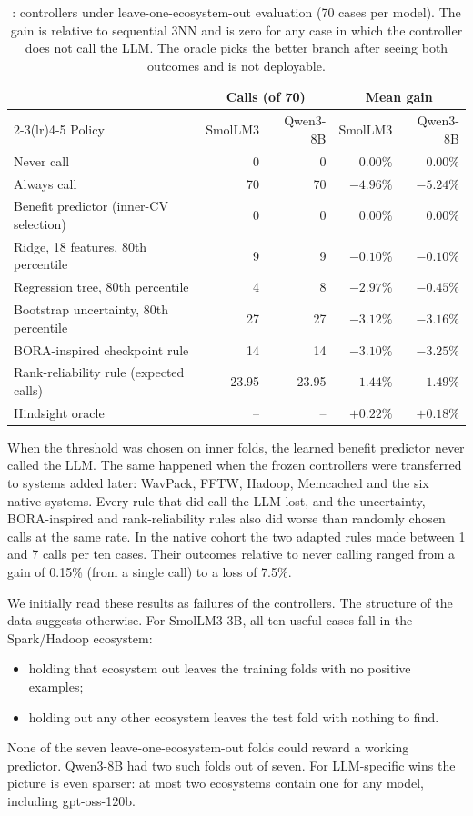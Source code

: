 \begin{table}[t]
\centering
\caption{: controllers under leave-one-ecosystem-out evaluation (70 cases per model). The gain is relative to sequential 3NN and is zero for any case in which the controller does not call the LLM. The oracle picks the better branch after seeing both outcomes and is not deployable.}
\label{tab:rq4}
\small
\begin{tabular}{lrrrr}
\toprule
 & \multicolumn{2}{c}{Calls (of 70)} & \multicolumn{2}{c}{Mean gain} \\
\cmidrule(lr){2-3}\cmidrule(lr){4-5}
Policy & SmolLM3 & Qwen3-8B & SmolLM3 & Qwen3-8B \\
\midrule
Never call & 0 & 0 & $0.00\%$ & $0.00\%$ \\
Always call & 70 & 70 & $-4.96\%$ & $-5.24\%$ \\
Benefit predictor (inner-CV selection) & 0 & 0 & $0.00\%$ & $0.00\%$ \\
Ridge, 18 features, 80th percentile & 9 & 9 & $-0.10\%$ & $-0.10\%$ \\
Regression tree, 80th percentile & 4 & 8 & $-2.97\%$ & $-0.45\%$ \\
Bootstrap uncertainty, 80th percentile & 27 & 27 & $-3.12\%$ & $-3.16\%$ \\
BORA-inspired checkpoint rule & 14 & 14 & $-3.10\%$ & $-3.25\%$ \\
Rank-reliability rule (expected calls) & 23.95 & 23.95 & $-1.44\%$ & $-1.49\%$ \\
\midrule
Hindsight oracle & -- & -- & $+0.22\%$ & $+0.18\%$ \\
\bottomrule
\end{tabular}
\end{table}

When the threshold was chosen on inner folds, the learned benefit predictor never called the LLM. The same happened when the frozen controllers were transferred to systems added later: WavPack, FFTW, Hadoop, Memcached and the six native systems. Every rule that did call the LLM lost, and the uncertainty, BORA-inspired and rank-reliability rules also did worse than randomly chosen calls at the same rate. In the native cohort the two adapted rules made between 1 and 7 calls per ten cases. Their outcomes relative to never calling ranged from a gain of 0.15\% (from a single call) to a loss of 7.5\%.

We initially read these results as failures of the controllers. The structure of the data suggests otherwise. For SmolLM3-3B, all ten useful cases fall in the Spark/Hadoop ecosystem:
\begin{itemize}
  \item holding that ecosystem out leaves the training folds with no positive examples;
  \item holding out any other ecosystem leaves the test fold with nothing to find.
\end{itemize}
None of the seven leave-one-ecosystem-out folds could reward a working predictor. Qwen3-8B had two such folds out of seven. For LLM-specific wins the picture is even sparser: at most two ecosystems contain one for any model, including gpt-oss-120b.

